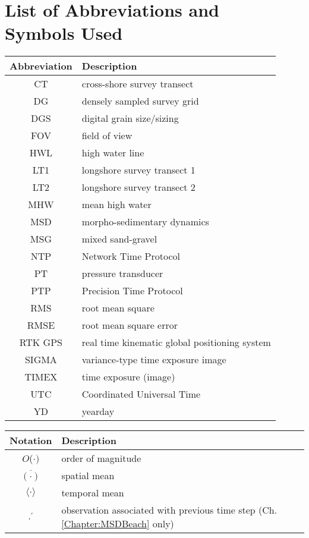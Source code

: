 \chapter*{List of Abbreviations and\\ \vspace{-0.5em} Symbols Used}


\setlongtables
\begin{longtable}{cl}
	\hline
	Abbreviation & Description\\
	\hline
	\endhead
	\hline
	\endfoot
	
	CT & cross-shore survey transect\\
	DG & densely sampled survey grid\\
	DGS & digital grain size/sizing\\
	FOV & field of view\\
	HWL & high water line\\
	LT1 & longshore survey transect 1\\
	LT2 & longshore survey transect 2\\
	MHW & mean high water\\
	MSD & morpho-sedimentary dynamics\\
	MSG & mixed sand-gravel\\
	NTP & Network Time Protocol\\
	PT & pressure transducer\\	
	PTP & Precision Time Protocol\\
	RMS & root mean square\\
	RMSE & root mean square error\\
	RTK GPS & real time kinematic global positioning system\\
	SIGMA & variance-type time exposure image\\
	TIMEX & time exposure (image)\\
	UTC & Coordinated Universal Time\\
	YD & yearday\\
	
	\hline
\end{longtable}


\setlongtables
\begin{longtable}{cl}
	\hline
	Notation & Description\\
	\hline
	\endhead
	\hline
	\endfoot
	
	$O$($\cdot)$ & order of magnitude\\
	$\overline{(\cdot)}$ & spatial mean\\
	$\langle \cdot \rangle$ & temporal mean\\
	$\cdot^{\prime}$ & observation associated with previous time step (Ch. \ref{Chapter:MSDBeach} only)\\
	
	\hline
\end{longtable}


